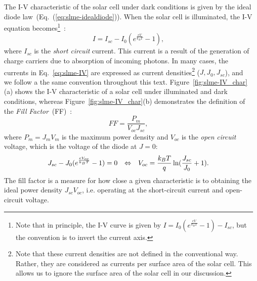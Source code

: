 \begin{refsection}
\pagebreak[4] 
 
The I-V characteristic of the solar cell under dark conditions is given by the 
ideal diode law~(Eq.~(\ref{eq:slme-idealdiode})). When the solar cell is 
illuminated, the I-V equation becomes\footnote{Note that in principle, the I-V 
curve is given by $I = I_0 (e^\frac{e V}{k_B T} - 1) - I_{sc}$, but the 
convention is to invert the current axis.}~\cite{Lindholm1979}: 
\begin{equation}\label{eq:slme-V} 
I = I_{sc} - I_0 (e^\frac{e V}{k_B T} - 1), 
\end{equation} 
where $I_{sc}$ is the \textit{short circuit} current. This current is a result 
of the generation of charge carriers due to absorption of incoming photons. In 
many cases, the currents in Eq.~\ref{eq:slme-IV} are expressed as current 
densities\footnote{Note that these current densities are not defined in the 
conventional way. Rather, they are considered as currents per surface area of 
the solar cell. This allows us to ignore the surface area of the solar cell in 
our discussion.} ($J,J_0,J_{sc}$), and we follow a the same convention 
throughout this text. Figure~\ref{fig:slme-IV_char}(a) shows the I-V 
characteristic of a solar cell under illuminated and dark conditions, whereas 
Figure~\ref{fig:slme-IV_char}(b) demonstrates the definition of the 
\textit{Fill Factor}~(FF)~\cite{Fonash2010}: 
\begin{equation} 
FF = \frac{P_{m}}{V_{oc} J_{sc}}, 
\end{equation} 
where $P_m = J_m V_m$ is the maximum power density and $V_{oc}$ is the 
\textit{open circuit} voltage, which is the voltage of the diode at $J = 0$: 
\begin{equation} 
J_{sc} - J_0 (e^\frac{eV_{oc}}{k_B T}-1) = 0 \hspace{0.1in} \Leftrightarrow 
\hspace{0.1in} V_{oc} = \frac{k_B T}{q} \ln (\frac{J_{sc}}{J_0} + 1). 
\end{equation} 
The fill factor is a measure for how close a given characteristic is to 
obtaining the ideal power density $J_{sc}V_{oc}$, i.e. operating at the 
short-circuit current and open-circuit voltage. 
 

\end{refsection}
